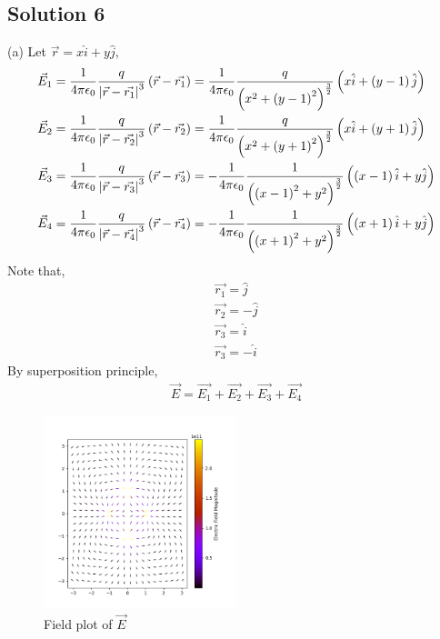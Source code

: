 \documentclass[12pt]{article}
\providecommand{\brak}[1]{\ensuremath{\left(#1\right)}}
\begin{document}
\subsection*{Solution 6}
(a) Let $\vec{r} = x\hat{i} + y\hat{j}$,
\begin{align*}
    \vec{E}_1 &= \frac{1}{4\pi\epsilon_0} \frac{q}{\abs{\vec{r} - \vec{r_1}}^3} \brak{\vec{r} - \vec{r_1}} = \frac{1}{4\pi\epsilon_0} \frac{q}{\brak{x^2 + \brak{y - 1}^2}^{\frac{3}{2}}} \brak{x\hat{i} + \brak{y - 1} \hat{j}}\\
    \vec{E}_2 &= \frac{1}{4\pi\epsilon_0} \frac{q}{\abs{\vec{r} - \vec{r_2}}^3} \brak{\vec{r} - \vec{r_2}} = \frac{1}{4\pi\epsilon_0} \frac{q}{\brak{x^2 + \brak{y + 1}^2}^{\frac{3}{2}}} \brak{x\hat{i} + \brak{y + 1} \hat{j}}\\
    \vec{E}_3 &= \frac{1}{4\pi\epsilon_0} \frac{q}{\abs{\vec{r} - \vec{r_3}}^3} \brak{\vec{r} - \vec{r_3}} = -\frac{1}{4\pi\epsilon_0} \frac{1}{\brak{\brak{x - 1}^2 + y^2}^{\frac{3}{2}}} \brak{\brak{x - 1}\hat{i} + y\hat{j}}\\
    \vec{E}_4 &= \frac{1}{4\pi\epsilon_0} \frac{q}{\abs{\vec{r} - \vec{r_4}}^3} \brak{\vec{r} - \vec{r_4}} = -\frac{1}{4\pi\epsilon_0} \frac{1}{\brak{\brak{x + 1}^2 + y^2}^{\frac{3}{2}}} \brak{\brak{x + 1}\hat{i} + y\hat{j}}
\end{align*}
Note that,
\begin{align*}
    \vec{r_1} = \hat{j}\\
    \vec{r_2} = -\hat{j}\\
    \vec{r_3} = \hat{i}\\
    \vec{r_3} = -\hat{i}
\end{align*}
By superposition principle,
\begin{align*}
    \vec{E} = \vec{E_1} + \vec{E_2} + \vec{E_3} + \vec{E_4}
\end{align*}

\begin{figure}
    \begin{center}
        \includegraphics[width=0.5\textwidth]{./q6/a_fig.png}
    \end{center}
    \caption{Field plot of $\vec{E}$}
\end{figure}
\end{document}
